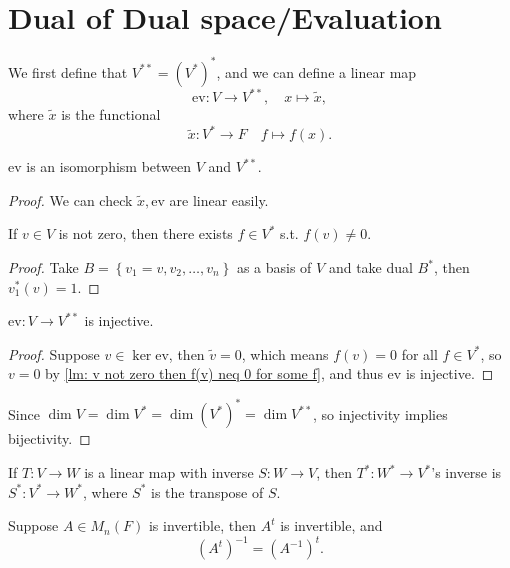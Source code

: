 \section{Dual of Dual space/Evaluation}
We first define that \(V^{* *} = \left( V^* \right)^*  \), and we can define a linear map
\[
    \mathrm{ev}:V \to V^{* *}, \quad x \mapsto \widetilde{x},   
\] where \(\widetilde{x} \) is the functional 
\[
    \widetilde{x}: V^* \to F \quad f \mapsto f(x). 
\] 

\begin{theorem}
    \(\mathrm{ev} \) is an isomorphism between \(V\) and \(V^{* *}\).  
\end{theorem}
\begin{proof}
    We can check \(\widetilde{x}, \mathrm{ev} \) are linear easily. 
    \begin{lemma} \label{lm: v not zero then f(v) neq 0 for some f}
        If \(v \in V\) is not zero, then there exists \(f \in V^*\) s.t. \(f(v) \neq 0\).   
    \end{lemma}
    \begin{proof}
        Take \(B = \left\{ v_1 = v, v_2, \dots , v_n \right\} \) as a basis of \(V\) and take dual \(B^*\), then \(v_1^*(v) = 1\).    
    \end{proof}
    \begin{claim}
        \(\mathrm{ev}:V \to V^{* *} \) is injective. 
    \end{claim}
    \begin{proof}
        Suppose \(v \in \ker \mathrm{ev} \), then \(\widetilde{v} = 0\), which means \(f(v) = 0\) for all \(f \in V^*\), so \(v = 0\) by \autoref{lm: v not zero then f(v) neq 0 for some f}, and thus \(\mathrm{ev} \) is injective.      
    \end{proof}

    Since \(\dim V = \dim V^* = \dim \left( V^* \right)^* = \dim V^{* *} \), so injectivity implies bijectivity. 
\end{proof}

\begin{corollary}
    If \(T:V \to W\) is a linear map with inverse \(S:W \to V\), then \(T^*: W^* \to V^*\)'s inverse is \(S^*: V^* \to  W^*\), where \(S^*\) is the transpose of \(S\).       
\end{corollary}

\begin{corollary}
    Suppose \(A \in M_n(F)\) is invertible, then \(A^t\) is invertible, and 
    \[
        \left( A^t \right)^{-1} = \left( A^{-1} \right)^t. 
    \] 
\end{corollary}